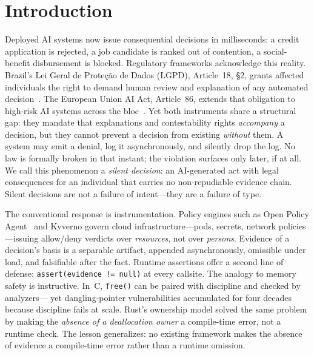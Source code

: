 
\section{Introduction}

Deployed AI systems now issue consequential decisions in milliseconds:
a credit application is rejected, a job candidate is ranked out of contention,
a social-benefit disbursement is blocked.
Regulatory frameworks acknowledge this reality.
Brazil's Lei Geral de Proteção de Dados (LGPD), Article~18, \S2,
grants affected individuals the right to demand human review and explanation
of any automated decision~\cite{brazil2018lgpd}.
The European Union AI Act, Article~86, extends that obligation to high-risk
AI systems across the bloc~\cite{eu2024aiact}.
Yet both instruments share a structural gap: they mandate that explanations
and contestability rights \emph{accompany} a decision,
but they cannot prevent a decision from existing \emph{without} them.
A system may emit a denial, log it asynchronously, and silently drop the log.
No law is formally broken in that instant; the violation surfaces only later,
if at all.
We call this phenomenon a \emph{silent decision}:
an AI-generated act with legal consequences for an individual
that carries no non-repudiable evidence chain.
Silent decisions are not a failure of intent---they are a failure of type.

The conventional response is instrumentation.
Policy engines such as Open Policy Agent~\cite{opa2024} and
Kyverno govern cloud infrastructure---pods, secrets, network policies---issuing
allow/deny verdicts over \emph{resources}, not over \emph{persons}.
Evidence of a decision's basis is a separable artifact, appended
asynchronously, omissible under load, and falsifiable after the fact.
Runtime assertions offer a second line of defense:
\texttt{assert(evidence != null)} at every callsite.
The analogy to memory safety is instructive.
In~C, \texttt{free()} can be paired with discipline and checked by analyzers---
yet dangling-pointer vulnerabilities accumulated for four decades because
discipline fails at scale.
Rust's ownership model solved the same problem by making the
\emph{absence of a deallocation owner} a compile-time error, not a runtime check.
The lesson generalizes:
no existing framework makes the absence of evidence a compile-time error
rather than a runtime omission.

